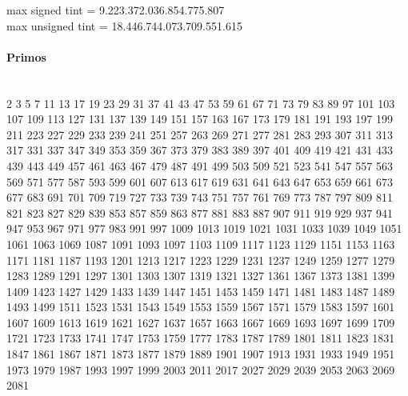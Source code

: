 {max signed tint = 9.223.372.036.854.775.807 \\
max unsigned tint = 18.446.744.073.709.551.615
\paragraph{Primos} \ \\
2 3 5 7 11 13 17 19 23 29
31 37 41 43 47 53 59 61 67 71
73 79 83 89 97 101 103 107 109 113
127 131 137 139 149 151 157 163 167 173
179 181 191 193 197 199 211 223 227 229
233 239 241 251 257 263 269 271 277 281
283 293 307 311 313 317 331 337 347 349
353 359 367 373 379 383 389 397 401 409
419 421 431 433 439 443 449 457 461 463
467 479 487 491 499 503 509 521 523 541
547 557 563 569 571 577 587 593 599 601
607 613 617 619 631 641 643 647 653 659
661 673 677 683 691 701 709 719 727 733
739 743 751 757 761 769 773 787 797 809
811 821 823 827 829 839 853 857 859 863
877 881 883 887 907 911 919 929 937 941
947 953 967 971 977 983 991 997 1009 1013
1019 1021 1031 1033 1039 1049 1051 1061 1063 1069
1087 1091 1093 1097 1103 1109 1117 1123 1129 1151
1153 1163 1171 1181 1187 1193 1201 1213 1217 1223
1229 1231 1237 1249 1259 1277 1279 1283 1289 1291
1297 1301 1303 1307 1319 1321 1327 1361 1367 1373
1381 1399 1409 1423 1427 1429 1433 1439 1447 1451
1453 1459 1471 1481 1483 1487 1489 1493 1499 1511
1523 1531 1543 1549 1553 1559 1567 1571 1579 1583
1597 1601 1607 1609 1613 1619 1621 1627 1637 1657
1663 1667 1669 1693 1697 1699 1709 1721 1723 1733
1741 1747 1753 1759 1777 1783 1787 1789 1801 1811
1823 1831 1847 1861 1867 1871 1873 1877 1879 1889
1901 1907 1913 1931 1933 1949 1951 1973 1979 1987
1993 1997 1999 2003 2011 2017 2027 2029 2039 2053
2063 2069 2081
 
}
